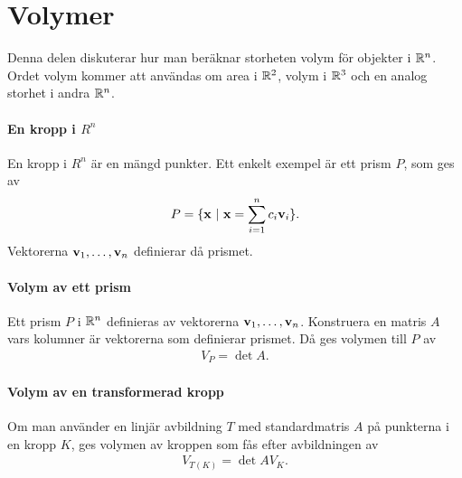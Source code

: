 \section{Volymer}
Denna delen diskuterar hur man beräknar storheten volym för objekter i $\mathbb{R}^n$. Ordet volym kommer att användas om area i $\mathbb{R}^2$, volym i $\mathbb{R}^3$ och en analog storhet i andra $\mathbb{R}^n$.

\paragraph{En kropp i $R^n$}
En kropp i $R^n$ är en mängd punkter. Ett enkelt exempel är ett prism $P$, som ges av
\begin{align*}
	P = \{\vect{x}~|~\vect{x} = \sum_{i = 1}^{n}c_i\vect{v}_i\}.
\end{align*}
Vektorerna $\vect{v}_1, \dots, \vect{v}_n$ definierar då prismet.

\paragraph{Volym av ett prism}
Ett prism $P$ i $\mathbb{R}^n$ definieras av vektorerna $\vect{v}_1, \dots, \vect{v}_n$. Konstruera en matris $A$ vars kolumner är vektorerna som definierar prismet. Då ges volymen till $P$ av
\begin{align*}
	V_P = \det{A}.
\end{align*}

\paragraph{Volym av en transformerad kropp}
Om man använder en linjär avbildning $T$ med standardmatris $A$ på punkterna i en kropp $K$, ges volymen av kroppen som fås efter avbildningen av
\begin{align*}
	V_{T(K)} = \det{A} V_K.
\end{align*}